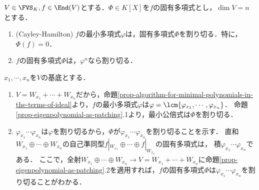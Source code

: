 \documentclass[uplatex, dvipdfmx]{jsreport}
\begin{document}
\begin{theorem}\label{thm-Cayley-Hamilton}
    $V\in\FVS_K,f\in\End(V)$とする．$\Phi\in K[X]$を$f$の固有多項式とし，$\dim V=n$とする．
    \begin{enumerate}
        \item (Cayley-Hamilton) $f$の最小多項式$\varphi$は，固有多項式$\Phi$を割り切る．特に，$\Phi(f)=0$．
        \item $f$の固有多項式$\Phi$は，$\varphi^n$なら割り切る．
    \end{enumerate}
\end{theorem}
\begin{Proof}
        $x_1,\cdots,x_n$を$V$の基底とする．
    \begin{enumerate}
        \item $V=W_{x_1}+\cdots+W_{x_n}$だから，命題\ref{prop-algorithm-for-minimal-polynomials-in-the-terms-of-ideal}より，$f$の最小多項式$\varphi$は$\varphi=\lcm\{\varphi_{x_1},\cdots,\varphi_{x_n}\}$．
        命題\ref{prop-eigenpolynomial-as-patching}.1より，最小公倍式は$\Phi$を割り切る．
        \item $\varphi_{x_1}\cdots\varphi_{x_n}$は$\varphi$を割り切るから，$\Phi$が$\varphi_{x_1}\cdots\varphi_{x_n}$を割り切ることを示す．
        直和$W_{x_1}\oplus\cdots\oplus W_{x_n}$の自己準同型$f|_{W_{x_1}}\oplus\cdots\oplus f|_{W_{x_n}}$の固有多項式は，
        積$\varphi_{x_1}\cdots\varphi_{x_n}$である．
        ここで，全射$W_{x_1}\oplus\cdots\oplus W_{x_n}\to V=W_{x_1}+\cdots+W_{x_n}$に命題\ref{prop-eigenpolynomial-as-patching}.2を適用すれば，$f$の固有多項式$\Phi$は$\varphi_{x_1}\cdots\varphi_{x_n}$を割り切ることがわかる．
    \end{enumerate}
\end{Proof}
\end{document}
